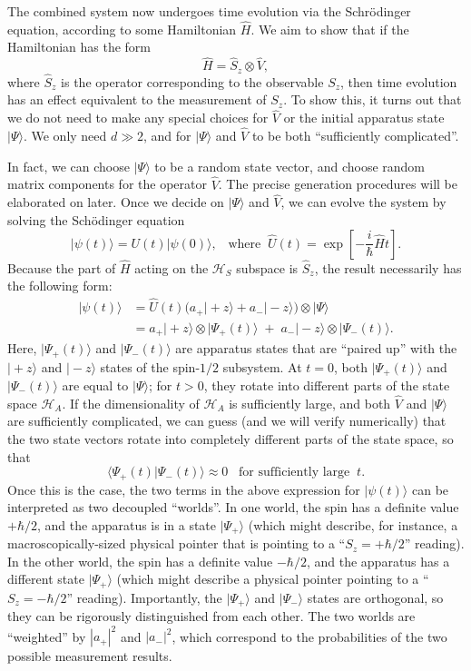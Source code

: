 \documentclass[pra,12pt]{revtex4}
\begin{document}
The combined system now undergoes time evolution via the Schr\"odinger
equation, according to some Hamiltonian $\hat{H}$.  We aim to show
that if the Hamiltonian has the form
$$\hat{H} = \hat{S}_z \otimes \hat{V},$$
where $\hat{S}_z$ is the operator corresponding to the observable
$S_z$, then time evolution has an effect equivalent to the measurement
of $S_z$.  To show this, it turns out that we do not need to make any
special choices for $\hat{V}$ or the initial apparatus state
$|\Psi\rangle$.  We only need $d \gg 2$, and for $|\Psi\rangle$ and
$\hat{V}$ to be both ``sufficiently complicated''.

In fact, we can choose $|\Psi\rangle$ to be a random state vector, and
choose random matrix components for the operator $\hat{V}$.  The
precise generation procedures will be elaborated on later.  Once we
decide on $|\Psi\rangle$ and $\hat{V}$, we can evolve the system by
solving the Sch\"odinger equation
$$|\psi(t)\rangle = U(t)|\psi(0)\rangle, \;\;\;\mathrm{where}\;\; \hat{U}(t) = \exp\left[-\frac{i}{\hbar}\hat{H}t\right].$$
Because the part of $\hat{H}$ acting on the $\mathscr{H}_S$ subspace
is $\hat{S}_z$, the result necessarily has the following form:
$$\begin{aligned}|\psi(t)\rangle &= \hat{U}(t)\Big(a_+ |\!+\!z\rangle + a_- |\!-\!z\rangle\Big) \otimes |\Psi\rangle \\ &= a_+ |\!+\!z\rangle \otimes |\Psi_+(t)\rangle \;+\; a_- |\!-\!z\rangle \otimes |\Psi_-(t)\rangle. \end{aligned}$$
Here, $|\Psi_+(t)\rangle$ and $|\Psi_-(t)\rangle$ are apparatus states
that are ``paired up'' with the $|\!+\!z\rangle$ and $|\!-\!z\rangle$
states of the spin-$1/2$ subsystem.  At $t=0$, both
$|\Psi_+(t)\rangle$ and $|\Psi_-(t)\rangle$ are equal to
$|\Psi\rangle$; for $t > 0$, they rotate into different parts of the
state space $\mathscr{H}_A$.  If the dimensionality of $\mathscr{H}_A$
is sufficiently large, and both $\hat{V}$ and $|\Psi\rangle$ are
sufficiently complicated, we can guess (and we will verify numerically) that
the two state vectors rotate into completely different parts of
the state space, so that
$$\langle\Psi_+(t) | \Psi_-(t)\rangle \approx 0 \;\;\;\textrm{for sufficiently large}\;\; t.$$
Once this is the case, the two terms in the above expression for
$|\psi(t)\rangle$ can be interpreted as two decoupled ``worlds''.  In
one world, the spin has a definite value $+\hbar/2$, and the apparatus
is in a state $|\Psi_+\rangle$ (which might describe, for instance, a
macroscopically-sized physical pointer that is pointing to a ``$S_z =
+\hbar/2$'' reading).  In the other world, the spin has a definite
value $-\hbar/2$, and the apparatus has a different state
$|\Psi_+\rangle$ (which might describe a physical pointer pointing to
a ``$S_z = -\hbar/2$'' reading).  Importantly, the $|\Psi_+\rangle$
and $|\Psi_-\rangle$ states are orthogonal, so they can be rigorously
distinguished from each other.  The two worlds are
``weighted'' by $|a_+|^2$ and $|a_-|^2$, which correspond to the
probabilities of the two possible measurement results.
\end{document}
